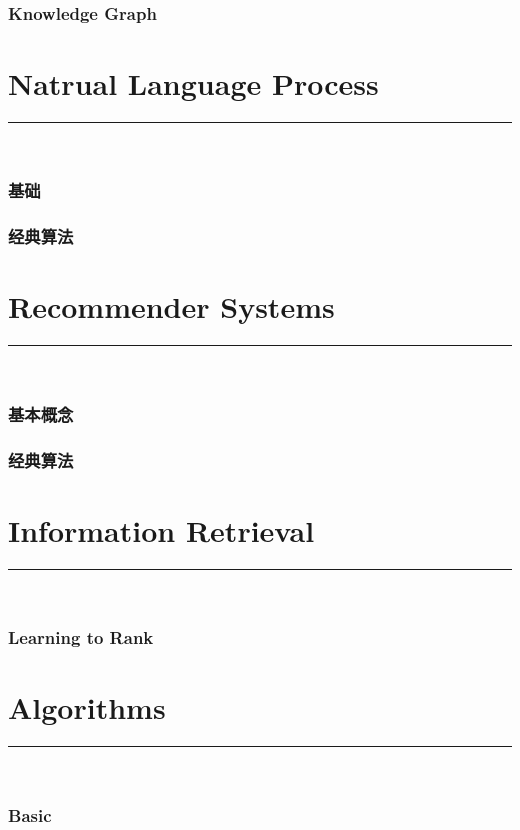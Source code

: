 \documentclass{article}
\begin{document}
\section{Knowledge Graph}



\clearpage
\part{Natrual Language Process}
{\noindent}	 \rule[-10pt]{17.5cm}{0.5em}\\
\section{基础}


\section{经典算法}



\clearpage
\part{Recommender Systems}
{\noindent}	 \rule[-10pt]{17.5cm}{0.5em}\\
\section{基本概念}


\section{经典算法}



\clearpage
\part{Information Retrieval}
{\noindent}	 \rule[-10pt]{17.5cm}{0.5em}\\
\section{Learning to Rank}



\clearpage
\part{Algorithms}
{\noindent}	 \rule[-10pt]{17.5cm}{0.5em}\\
\section{Basic}

\end{document}
